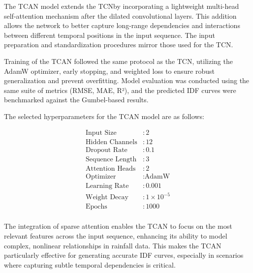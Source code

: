 \vspace{1em}

The TCAN model extends the TCN\@ by incorporating a lightweight multi-head self-attention mechanism after the dilated convolutional layers. This addition allows the network to better capture long-range dependencies and interactions between different temporal positions in the input sequence. The input preparation and standardization procedures mirror those used for the TCN\@.

\vspace{1em}

Training of the TCAN followed the same protocol as the TCN, utilizing the AdamW optimizer, early stopping, and weighted loss to ensure robust generalization and prevent overfitting. Model evaluation was conducted using the same suite of metrics (RMSE, MAE, R²), and the predicted IDF curves were benchmarked against the Gumbel-based results.

\vspace{1em}

The selected hyperparameters for the TCAN model are as follows:

\begin{align*}
\text{Input Size} &: 2 \\
\text{Hidden Channels} &: 12 \\
\text{Dropout Rate} &: 0.1 \\
\text{Sequence Length} &: 3 \\
\text{Attention Heads} &: 2 \\
\text{Optimizer} &: \text{AdamW} \\
\text{Learning Rate} &: 0.001 \\
\text{Weight Decay} &: 1\times10^{-5} \\
\text{Epochs} &: 1000 \\
\end{align*}

The integration of sparse attention enables the TCAN to focus on the most relevant features across the input sequence, enhancing its ability to model complex, nonlinear relationships in rainfall data. This makes the TCAN particularly effective for generating accurate IDF curves, especially in scenarios where capturing subtle temporal dependencies is critical.
